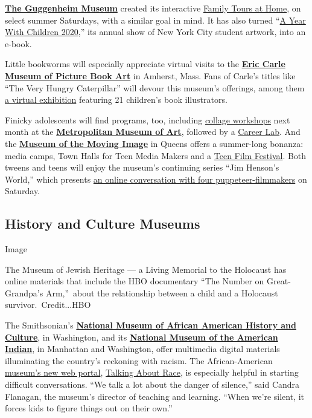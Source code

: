 \textbf{\href{https://www.guggenheim.org/}{The Guggenheim Museum}}
created its interactive
\href{https://www.guggenheim.org/event/guggenheim-family-tours-at-home}{Family
Tours at Home}, on select summer Saturdays, with a similar goal in mind.
It has also turned
``\href{https://www.guggenheim.org/exhibition/a-year-with-children-2020}{A
Year With Children 2020},'' its annual show of New York City student
artwork, into an e-book.

Little bookworms will especially appreciate virtual visits to the
\textbf{\href{https://www.carlemuseum.org/}{Eric Carle Museum of Picture
Book Art}} in Amherst, Mass. Fans of Carle's titles like ``The Very
Hungry Caterpillar'' will devour this museum's offerings, among them
\href{https://sway.office.com/4gm5EH94jhEswJ7z}{a virtual exhibition}
featuring 21 children's book illustrators.

Finicky adolescents will find programs, too, including
\href{https://www.metmuseum.org/events/programs/teens/teen-studio}{collage
workshops} next month at the
\textbf{\href{https://www.metmuseum.org/}{Metropolitan Museum of Art}},
followed by a
\href{https://www.metmuseum.org/events/programs/teens/career-labs}{Career
Lab}. And the \textbf{\href{http://www.movingimage.us/}{Museum of the
Moving Image}} in Queens offers a summer-long bonanza: media camps, Town
Halls for Teen Media Makers and a
\href{http://www.movingimage.us/education/teencouncil}{Teen Film
Festival}. Both tweens and teens will enjoy the museum's continuing
series ``Jim Henson's World,'' which presents
\href{http://www.movingimage.us/visit/calendar/2020/06/20/detail/jim-hensons-world-new-visions-of-puppets-on-screen}{an
online conversation with four puppeteer-filmmakers} on Saturday.

\hypertarget{history-and-culture-museums}{%
\subsection{History and Culture
Museums}\label{history-and-culture-museums}}

Image

The Museum of Jewish Heritage --- a Living Memorial to the Holocaust has
online materials that include the HBO documentary ``The Number on
Great-Grandpa's Arm,''~about the relationship between a child and a
Holocaust survivor.~Credit...HBO

The Smithsonian's \textbf{\href{https://nmaahc.si.edu/}{National Museum
of African American History and Culture}}, in Washington, and its
\textbf{\href{https://americanindian.si.edu/}{National Museum of the
American Indian}}, in Manhattan and Washington, offer multimedia digital
materials illuminating the country's reckoning with racism. The
African-American
\href{https://www.nytimes.com/2020/06/11/arts/design/museums-protests-race-smithsonian.html}{museum's
new web portal},
\href{https://nmaahc.si.edu/learn/talking-about-race}{Talking About
Race}, is especially helpful in starting difficult conversations. ``We
talk a lot about the danger of silence,'' said Candra Flanagan, the
museum's director of teaching and learning. ``When we're silent, it
forces kids to figure things out on their own.''

